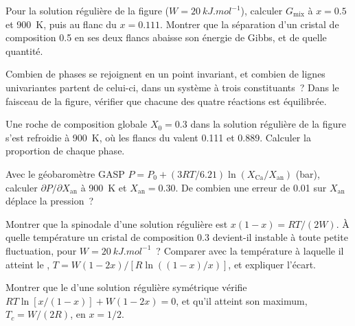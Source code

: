 \begin{exercise}[$\star\star$]\label{exo:b3:petrological-thermodynamics:6}
Pour la solution régulière de la figure ($W = \qty{20}{kJ.mol^{-1}}$), calculer
$G_{\text{mix}}$ à $x = 0.5$ et \qty{900}{K}, puis au flanc du  $x =
0.111$. Montrer que la séparation d'un cristal de composition 0.5 en ses deux flancs
abaisse son énergie de Gibbs, et de quelle quantité.
\end{exercise}

\begin{exercise}[$\star\star$]\label{exo:b3:petrological-thermodynamics:7}
Combien de phases se rejoignent en un point invariant, et combien de lignes univariantes
partent de celui-ci, dans un système à trois constituants~? Dans le faisceau de la
figure, vérifier que chacune des quatre réactions est équilibrée.
\end{exercise}

\begin{exercise}[$\star\star$]\label{exo:b3:petrological-thermodynamics:8}
Une roche de composition globale $X_0 = 0.3$ dans la solution régulière de la figure
s'est refroidie à \qty{900}{K}, où les flancs du  valent 0.111 et 0.889.
Calculer la proportion de chaque phase.
\end{exercise}

\begin{exercise}[$\star\star$]\label{exo:b3:petrological-thermodynamics:9}
Avec le géobaromètre GASP $P = P_0 + (3RT/6.21)\ln(X_{\text{Ca}}/X_{\text{an}})$
(bar), calculer $\partial P/\partial X_{\text{an}}$ à \qty{900}{K} et
$X_{\text{an}} = 0.30$. De combien une erreur de 0.01 sur $X_{\text{an}}$
déplace la pression~?
\end{exercise}

\begin{exercise}[$\star\star\star$]\label{exo:b3:petrological-thermodynamics:10}
Montrer que la spinodale d'une solution régulière est $x(1 - x) = RT/(2W)$. À quelle
température un cristal de composition 0.3 devient-il instable à toute petite
fluctuation, pour $W = \qty{20}{kJ.mol^{-1}}$~? Comparer avec la température à
laquelle il atteint le , $T = W(1 - 2x)/[R\ln((1 - x)/x)]$, et expliquer
l'écart.
\end{exercise}

\begin{exercise}[$\star\star\star$]\label{exo:b3:petrological-thermodynamics:11}
Montrer que le  d'une solution régulière symétrique vérifie $RT\ln[x/(1 -
x)] + W(1 - 2x) = 0$, et qu'il atteint son maximum, $T_c = W/(2R)$, en $x
= 1/2$.
\end{exercise}

